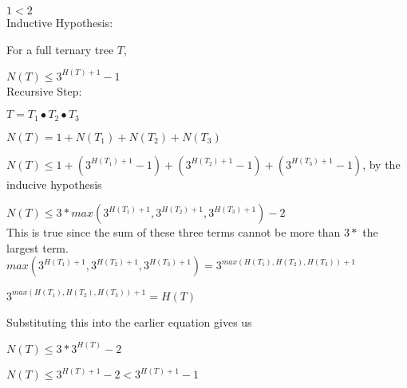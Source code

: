 \documentclass[11pt]{article}
\begin{document}
\begin{enumerate}
\begin{enumerate}[(a)]
		$1<2$ \\

		Inductive Hypothesis:

		For a full ternary tree $T$,

		$N(T) \leq 3^{H(T)+1}-1$ \\

		Recursive Step:

		$T = T_1 \bullet T_2 \bullet T_3$

		$N(T) = 1 + N(T_1) + N(T_2) + N(T_3)$

		$N(T) \leq 1 + (3^{H(T_1)+1}-1) + (3^{H(T_2)+1}-1)
		+ (3^{H(T_3)+1}-1)$, by the inducive hypothesis

		$N(T) \leq 3 * max(3^{H(T_1)+1}, 3^{H(T_2)+1}, 3^{H(T_3)+1}) - 2$ \\

		This is true since the sum of these three terms cannot be
		more than $3*$ the largest term. \\

		$max(3^{H(T_1)+1}, 3^{H(T_2)+1}, 3^{H(T_3)+1}) =
		3^{max(H(T_1), H(T_2), H(T_3)) + 1}$

		$3^{max(H(T_1), H(T_2), H(T_3)) + 1} = H(T)$

		Substituting this into the earlier equation gives us

		$N(T) \leq 3 * 3^{H(T)} - 2$

		$N(T) \leq 3^{H(T)+1} - 2 < 3^{H(T)+1} - 1$

		\end{enumerate}

\end{enumerate}
\end{document}
